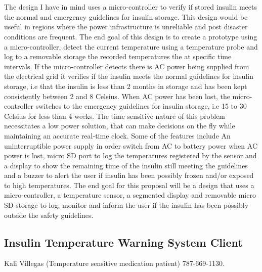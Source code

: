 \pagestyle{plain}
\chapter{}
The design I have in mind uses a micro-controller to verify if stored insulin meets the normal and emergency guidelines for insulin storage. This design would be useful in regions where the power infrastructure is unreliable and post disaster conditions are frequent. The end goal of this design is to create a prototype using a micro-controller, detect the current temperature using a temperature probe and log to a removable storage the recorded temperatures the at specific time intervals. If the micro-controller detects there is AC power being supplied from the electrical grid it verifies if the insulin meets the normal guidelines for insulin storage, i.e that the insulin is less than 2 months in storage and has been kept consistently between 2 and 8 Celsius. When AC power has been lost, the micro-controller switches to the emergency guidelines for insulin storage, i.e 15 to 30 Celsius for less than 4 weeks. The time sensitive nature of this problem necessitates a low power solution, that can make decisions on the fly while maintaining an accurate real-time clock. Some of the features include An uninterruptible power supply in order switch from AC to battery power when AC power is lost, micro SD port to log the temperatures registered by the sensor and a display to show the remaining time of the insulin still meeting the guidelines and a buzzer to alert the user if insulin has been possibly frozen and/or exposed to high temperatures. The end goal for this proposal will be a design that uses a micro-controller, a temperature sensor, a segmented display and removable micro SD storage to log, monitor and inform the user if the insulin has been possibly outside the safety guidelines.
\newpage
\section{Insulin Temperature Warning System Client}
Kali Villegas (Temperature sensitive medication patient) 787-669-1130.
